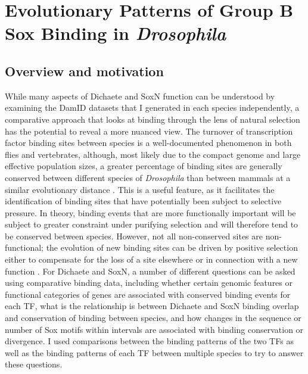 \chapter{Evolutionary Patterns of Group B Sox Binding in \emph{Drosophila}}

\hrulefill

\section{Overview and motivation}

While many aspects of Dichaete and SoxN function can be understood by examining the DamID datasets that I generated in each species independently, a comparative approach that looks at binding through the lens of natural selection has the potential to reveal a more nuanced view. The turnover of transcription factor binding sites between species is a well-documented phenomenon in both flies and vertebrates, although, most likely due to the compact genome and large effective population sizes, a greater percentage of binding sites are generally conserved between different species of \emph{Drosophila} than between mammals at a similar evolutionary distance \citep{bradley_binding_2010,he_high_2011,odom_tissue-specific_2007,schmidt_five-vertebrate_2010,stefflova_cooperativity_2013,villar_evolution_2014}. This is a useful feature, as it facilitates the identification of binding sites that have potentially been subject to selective pressure. In theory, binding events that are more functionally important will be subject to greater constraint under purifying selection and will therefore tend to be conserved between species. However, not all non-conserved sites are non-functional; the evolution of new binding sites can be driven by positive selection either to compensate for the loss of a site elsewhere or in connection with a new function \citep{arnoult_emergence_2013,frankel_conserved_2012,he_does_2011,kalay_nomadic_2010}. For Dichaete and SoxN, a number of different questions can be asked using comparative binding data, including whether certain genomic features or functional categories of genes are associated with conserved binding events for each TF, what is the relationship is between Dichaete and SoxN binding overlap and conservation of binding between species, and how changes in the sequence or number of Sox motifs within intervals are associated with binding conservation or divergence. I used comparisons between the binding patterns of the two TFs as well as the binding patterns of each TF between multiple species to try to answer these questions.\\

